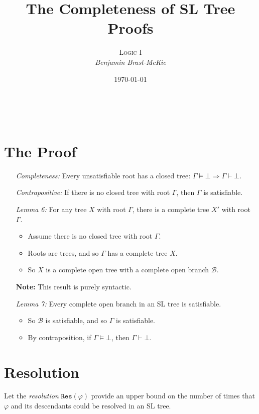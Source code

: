 \documentclass[a4paper, 11pt]{article} %
\title{\textbf{The Completeness of SL Tree Proofs}} %
\author{\textsc{Logic I}\\ \em Benjamin Brast-McKie} %
\date{\today} %
\makeatletter
\newcommand{\B}{\mathcal{B}}
\newcommand{\res}{\texttt{Res}}
\renewcommand{\maketitle}{ %
\begin{flushright} %
{\LARGE\@title} %

\vspace{10pt} %

{\@author} %
\\\@date %

\vspace{10pt} %
\end{flushright}
}
\makeatother
\begin{document}
\maketitle %

\thispagestyle{empty}


\section*{The Proof}

\begin{enumerate}
  \item[\it Completeness:] Every unsatisfiable root has a closed tree: $\Gamma \vDash \bot \Rightarrow \Gamma \vdash \bot$.
  \item[\it Contrapositive:] If there is no closed tree with root $\Gamma$, then $\Gamma$ is satisfiable.
  \item[\it Lemma 6:] For any tree $X$ with root $\Gamma$, there is a complete tree $X'$ with root $\Gamma$. 
    \begin{itemize}
      \item Assume there is no closed tree with root $\Gamma$.
      \item Roots are trees, and so $\Gamma$ has a complete tree $X$. 
      \item So $X$ is a complete open tree with a complete open branch $\B$. 
    \end{itemize}
  \item[\bf Note:] This result is purely syntactic.
  \item[\it Lemma 7:] Every complete open branch in an SL tree is satisfiable.
    \begin{itemize}
      \item So $\B$ is satisfiable, and so $\Gamma$ is satisfiable. 
      \item By contraposition, if $\Gamma \vDash \bot$, then $\Gamma \vdash \bot$.
    \end{itemize}
\end{enumerate}




\section*{Resolution}

Let the \textit{resolution} $\res(\varphi)$ provide an upper bound on the number of times that $\varphi$ and its descendants could be resolved in an SL tree. 
\end{document}
